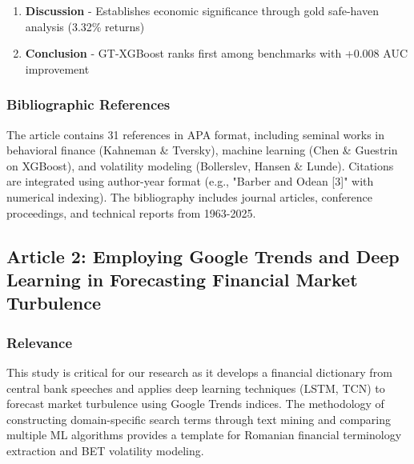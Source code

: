 \documentclass[12pt,a4paper]{article}
\begin{document}
\begin{enumerate}
\begin{itemize}
        \item 4.1 Descriptive Analysis - 256 monthly observations, 81 VIX spikes
        \item 4.2 Behavioral Sentiment Correlations - Financial crisis searches lead by 1 month (correlation: 0.638)
        \item 4.3 GT-XGBoost Model Performance - ROC AUC 0.796, precision 65.4\%, recall 58.6\%
        \item 4.4 Academic Benchmark Comparison - Outperforms all 8 baselines
    \end{itemize}
    \item \textbf{Discussion} - Establishes economic significance through gold safe-haven analysis (3.32\% returns)
    \item \textbf{Conclusion} - GT-XGBoost ranks first among benchmarks with +0.008 AUC improvement
\end{enumerate}

\subsubsection{Bibliographic References}
The article contains 31 references in APA format, including seminal works in behavioral finance (Kahneman \& Tversky), machine learning (Chen \& Guestrin on XGBoost), and volatility modeling (Bollerslev, Hansen \& Lunde). Citations are integrated using author-year format (e.g., "Barber and Odean [3]" with numerical indexing). The bibliography includes journal articles, conference proceedings, and technical reports from 1963-2025.

\subsection{Article 2: Employing Google Trends and Deep Learning in Forecasting Financial Market Turbulence}

\subsubsection{Relevance}
This study is critical for our research as it develops a financial dictionary from central bank speeches and applies deep learning techniques (LSTM, TCN) to forecast market turbulence using Google Trends indices. The methodology of constructing domain-specific search terms through text mining and comparing multiple ML algorithms provides a template for Romanian financial terminology extraction and BET volatility modeling.
\end{document}
